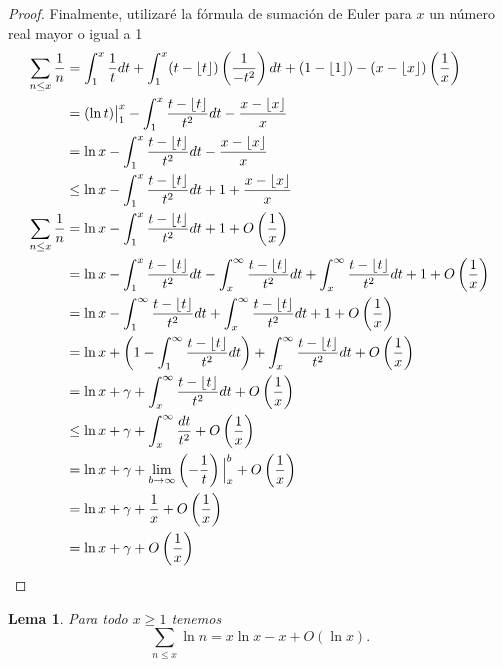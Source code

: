 \documentclass{article}
\DeclarePairedDelimiter\floor{\lfloor}{\rfloor}
\newtheorem{lemma}[theorem]{Lema}
\theoremstyle{definition}
\theoremstyle{remark}
\begin{document}
\begin{proof}
Finalmente, utilizar\'e la f\'ormula de sumaci\'on de Euler para $x$ un n\'umero real mayor o igual a 1
\begin{align*}
\sum_{n \leq x} \frac{1}{n} &= \int_1^x \frac{1}{t} dt + \int_1^x (t - \floor{t})\left(\frac{1}{-t^2}\right) dt 
+ (1 - \floor{1}) - (x - \floor{x})\left(\frac{1}{x}\right) \\
&= (\ln t) \big|_1^x - \int_1^x \frac{t - \floor{t}}{t^2} dt - \frac{x - \floor{x}}{x} \\
&= \ln x - \int_1^x \frac{t - \floor{t}}{t^2} dt - \frac{x - \floor{x}}{x} \\
&\leq \ln x - \int_1^x \frac{t - \floor{t}}{t^2} dt + 1 + \frac{x - \floor{x}}{x} \\
\sum_{n \leq x} \frac{1}{n} &= \ln x - \int_1^x \frac{t - \floor{t}}{t^2} dt + 1 + O\left(\frac{1}{x}\right) \\
&= \ln x - \int_1^x \frac{t - \floor{t}}{t^2} dt - \int_x^\infty \frac{t - \floor{t}}{t^2} dt 
+ \int_x^\infty \frac{t - \floor{t}}{t^2} dt + 1 + O\left(\frac{1}{x}\right) \\
&= \ln x - \int_1^\infty \frac{t - \floor{t}}{t^2} dt + \int_x^\infty \frac{t - \floor{t}}{t^2} dt + 1 + O\left(\frac{1}{x}\right) \\
&= \ln x + \left(1 - \int_1^\infty \frac{t - \floor{t}}{t^2} dt\right) + \int_x^\infty \frac{t - \floor{t}}{t^2} dt + O\left(\frac{1}{x}\right) \\
&= \ln x + \gamma + \int_x^\infty \frac{t - \floor{t}}{t^2} dt + O\left(\frac{1}{x}\right) \\
&\leq \ln x + \gamma + \int_x^\infty \frac{dt}{t^2} + O\left(\frac{1}{x}\right) \\
&= \ln x + \gamma + \lim_{b \to \infty} \left(-\frac{1}{t}\right) \Big|_x^b + O\left(\frac{1}{x}\right) \\
&= \ln x + \gamma + \frac{1}{x} + O\left(\frac{1}{x}\right) \\
&= \ln x + \gamma + O\left(\frac{1}{x}\right)
\end{align*}
\end{proof}

\begin{lemma}
Para todo $x \geq 1$ tenemos
$$\sum_{n \leq x} \ln n = x\ln x - x + O(\ln x).$$
\end{lemma}
\end{document}
